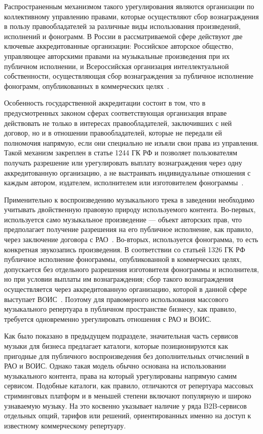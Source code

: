 Распространенным механизмом такого урегулирования являются организации по коллективному управлению правами, которые осуществляют сбор вознаграждения в пользу правообладателей за различные виды использования произведений, исполнений и фонограмм. В России в рассматриваемой сфере действуют две ключевые аккредитованные организации: Российское авторское общество, управляющее авторскими правами на музыкальные произведения при их публичном исполнении, и Всероссийская организация интеллектуальной собственности, осуществляющая сбор вознаграждения за публичное исполнение фонограмм, опубликованных в коммерческих целях~\cite{rao_usage,vois_about}.

Особенность государственной аккредитации состоит в том, что в предусмотренных законом сферах соответствующая организация вправе действовать не только в интересах правообладателей, заключивших с ней договор, но и в отношении правообладателей, которые не передали ей полномочия напрямую, если они специально не изъяли свои права из управления. Такой механизм закреплен в статье 1244 ГК РФ и позволяет пользователям получать разрешение или урегулировать выплату вознаграждения через одну аккредитованную организацию, а не выстраивать индивидуальные отношения с каждым автором, издателем, исполнителем или изготовителем фонограммы~\cite{gk_rf_1244}.

Применительно к воспроизведению музыкального трека в заведении необходимо учитывать двойственную правовую природу используемого контента. Во-первых, используется само музыкальное произведение — объект авторских прав, что предполагает получение разрешения на его публичное исполнение, как правило, через заключение договора с РАО~\cite{gk_rf_1270,rao_usage}. Во-вторых, используется фонограмма, то есть конкретная звукозапись произведения. В соответствии со статьей 1326 ГК РФ публичное исполнение фонограммы, опубликованной в коммерческих целях, допускается без отдельного разрешения изготовителя фонограммы и исполнителя, но при условии выплаты им вознаграждения; сбор такого вознаграждения осуществляется через аккредитованную организацию, которой в данной сфере выступает ВОИС~\cite{vois_about,gk_rf_1326}. Поэтому для правомерного использования массового музыкального репертуара в публичном пространстве бизнесу, как правило, требуется одновременно урегулировать отношения с РАО и ВОИС.

Как было показано в предыдущем подразделе, значительная часть сервисов музыки для бизнеса предлагает каталоги, которые позиционируются как пригодные для публичного воспроизведения без дополнительных отчислений в РАО и ВОИС. Однако такая модель обычно основана на использовании музыкального контента, права на который урегулированы напрямую самим сервисом. Подобные каталоги, как правило, отличаются от репертуара массовых стриминговых платформ и в меньшей степени включают популярную и широко узнаваемую музыку. На это косвенно указывает наличие у ряда B2B-сервисов отдельных опций, тарифов или решений, ориентированных именно на доступ к известному коммерческому репертуару.

